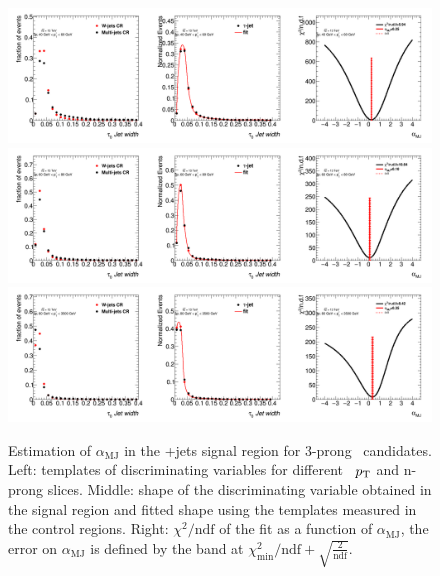 	\begin{figure}
	\begin{center}
	\includegraphics[width=1\textwidth]{chapters/chapter6_HPlus/images/FFs/FFs_FIT_SR_TAUJET_3_40_60.png}
	\includegraphics[width=1\textwidth]{chapters/chapter6_HPlus/images/FFs/FFs_FIT_SR_TAUJET_3_60_80.png}
	\includegraphics[width=1\textwidth]{chapters/chapter6_HPlus/images/FFs/FFs_FIT_SR_TAUJET_3_80_3500.png}

	\end{center}
	\caption{
	Estimation of $\alpha_\mathrm{MJ}$ in the \tauhad+jets signal region for
	3-prong \tauhad\ candidates. Left: templates of discriminating variables for different \tauhad\ $p_{\text{T}}$
	and n-prong slices. Middle: shape of the discriminating variable obtained in the signal region and fitted
	shape using the templates measured in the control regions. Right: $\chi^2/\mathrm{ndf}$ of the fit as a
	function of $\alpha_\mathrm{MJ}$, the error on $\alpha_\mathrm{MJ}$ is defined by the band at
	$\chi^2_\mathrm{min}/\mathrm{ndf}+\sqrt{\frac{2}{\mathrm{ndf}}}$.
	}
	\label{fig:mm:Fits:region3_3}
	\end{figure}

